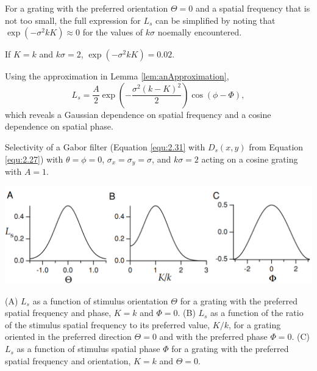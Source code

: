 \begin{lem}
  \label{lem:anApproximation}
  For a grating with the preferred orientation $\Theta = 0$ and a spatial frequency that is not too small, the full expression for $L_s$ can be simplified by noting that $\exp(-\sigma^2kK) \approx 0$ for the values of $k\sigma$ noemally encountered.
\end{lem}

\begin{exm}
  If $K = k$ and $k\sigma = 2$, $\exp(-\sigma^2kK) = 0.02$.
\end{exm}

\begin{prop}
  Using the approximation in Lemma \ref{lem:anApproximation},
  \begin{equation}
    \label{equ:2.34}
    L_s = \frac{A}{2}\exp\left(-\frac{\sigma^2(k-K)^2}{2}\right)\cos(\phi-\Phi),
  \end{equation}
  which reveals a Gaussian dependence on spatial frequency and a cosine
dependence on spatial phase.
\end{prop}

\begin{exm}
  Selectivity of a Gabor filter (Equation \ref{equ:2.31} with $D_s(x,y)$ from Equation \ref{equ:2.27}) with $\theta = \phi = 0$, $\sigma_x = \sigma_y = \sigma$, and $k\sigma = 2$ acting on a cosine grating with $A = 1$.
  \begin{center}
    \includegraphics[scale=0.2]{./png/showSelectivity}
  \end{center}
  (A) $L_s$ as a function of stimulus orientation $\Theta$ for a grating with the preferred spatial frequency and phase, $K = k$ and $\Phi = 0$. (B) $L_s$ as a function of the ratio of the stimulus spatial frequency to its preferred value, $K/k$, for a grating oriented in the preferred direction $\Theta = 0$ and with the preferred phase $\Phi = 0$. (C) $L_s$ as a function of stimulus spatial phase $\Phi$ for a grating with the preferred spatial frequency and orientation, $K = k$ and $\Theta = 0$.
\end{exm}

